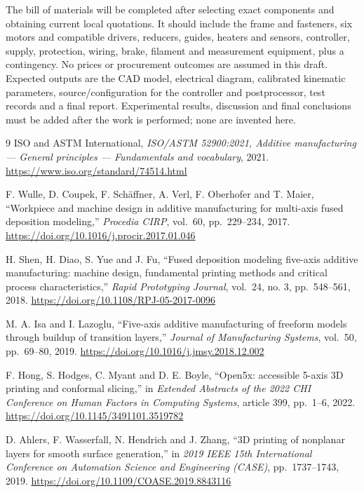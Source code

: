 \documentclass[12pt,a4paper]{article}
\begin{document}
The bill of materials will be completed after selecting exact components and obtaining current local
  quotations. It should include the frame and fasteners, six motors and compatible drivers, reducers,
  guides, heaters and sensors, controller, supply, protection, wiring, brake, filament and measurement
  equipment, plus a contingency. No prices or procurement outcomes are assumed in this draft. Expected
  outputs are the CAD model, electrical diagram, calibrated kinematic parameters, source/configuration
  for the controller and postprocessor, test records and a final report. Experimental results, discussion
  and final conclusions must be added after the work is performed; none are invented here.


\clearpage
\begin{thebibliography}{9}
 ISO and ASTM International, \emph{ISO/ASTM 52900:2021, Additive manufacturing ---
  General principles --- Fundamentals and vocabulary}, 2021.
  \url{https://www.iso.org/standard/74514.html}

 F. Wulle, D. Coupek, F. Sch\"{a}ffner, A. Verl, F. Oberhofer and T. Maier,
  ``Workpiece and machine design in additive manufacturing for multi-axis fused deposition modeling,''
  \emph{Procedia CIRP}, vol.~60, pp.~229--234, 2017. \url{https://doi.org/10.1016/j.procir.2017.01.046}

 H. Shen, H. Diao, S. Yue and J. Fu, ``Fused deposition modeling five-axis additive
  manufacturing: machine design, fundamental printing methods and critical process characteristics,''
  \emph{Rapid Prototyping Journal}, vol.~24, no. 3, pp.~548--561, 2018.
  \url{https://doi.org/10.1108/RPJ-05-2017-0096}

 M. A. Isa and I. Lazoglu, ``Five-axis additive manufacturing of freeform models through
  buildup of transition layers,'' \emph{Journal of Manufacturing Systems}, vol.~50, pp.~69--80, 2019.
  \url{https://doi.org/10.1016/j.jmsy.2018.12.002}

 F. Hong, S. Hodges, C. Myant and D. E. Boyle, ``Open5x: accessible 5-axis 3D printing
  and conformal slicing,'' in \emph{Extended Abstracts of the 2022 CHI Conference on Human Factors in
  Computing Systems}, article 399, pp.~1--6, 2022. \url{https://doi.org/10.1145/3491101.3519782}

 D. Ahlers, F. Wasserfall, N. Hendrich and J. Zhang, ``3D printing of nonplanar
  layers for smooth surface generation,'' in \emph{2019 IEEE 15th International Conference on Automation
  Science and Engineering (CASE)}, pp.~1737--1743, 2019. \url{https://doi.org/10.1109/COASE.2019.8843116}


\end{thebibliography}
\end{document}

